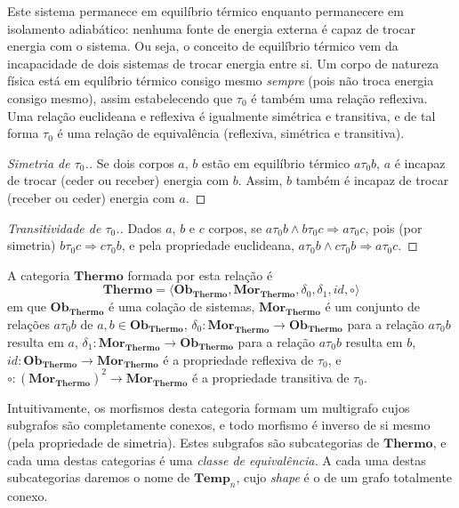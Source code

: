 \documentclass[a4paper]{article}
\newcommand{\trls}{{\tau_0}}
\newcommand{\trl}[2]{{#1 \trls #2}}
\newcommand{\termo}{{\mathbf{Thermo}}}
\newcommand{\obtermo}{{\mathbf{Ob}_\termo}}
\newcommand{\mortermo}{{\mathbf{Mor}_\termo}}
\newcommand{\tempn}[1]{{\mathbf{Temp}_{#1}}}
\newcommand{\temp}{{\tempn{n}}}
\begin{document}
Este sistema permanece em equilíbrio térmico enquanto permanecere em isolamento adiabático: nenhuma fonte de energia externa é capaz de trocar energia com o sistema. Ou seja, o conceito de equilíbrio térmico vem da incapacidade de dois sistemas de trocar energia entre si. Um corpo de natureza física está em equlíbrio térmico consigo mesmo {\it sempre} (pois não troca energia consigo mesmo), assim estabelecendo que $\trls$ é também uma relação reflexiva. Uma relação euclideana e reflexiva é igualmente simétrica e transitiva, e de tal forma $\trls$ é uma relação de equivalência (reflexiva, simétrica e transitiva).

\begin{proof}[Simetria de $\trls$.] \label{pr:simetria}
Se dois corpos $a$, $b$ estão em equilíbrio térmico $\trl{a}{b}$, $a$ é incapaz de trocar (ceder ou receber) energia com $b$. Assim, $b$ também é incapaz de trocar (receber ou ceder) energia com $a$. 
\end{proof}

\begin{proof}[Transitividade de $\trls$.] \label{pr:transitividade}
Dados $a$, $b$ e $c$ corpos, se $\trl{a}{b} \wedge \trl{b}{c} \Rightarrow \trl{a}{c}$, pois (por simetria) $\trl{b}{c} \Rightarrow \trl{c}{b}$, e pela propriedade euclideana, $\trl{a}{b} \wedge \trl{c}{b} \Rightarrow \trl{a}{c}$.
\end{proof}

A categoria $\termo$ formada por esta relação é
\begin{equation} \label{ma:termo}
\termo = \langle \obtermo, \mortermo, \delta_0, \delta_1, id, \circ \rangle
\end{equation}
em que $\obtermo$ é uma colação de sistemas, $\mortermo$ é um conjunto de relações $\trl{a}{b}$ de $a,b \in \obtermo$, $\delta_0: \mortermo \to \obtermo$ para a relação $\trl{a}{b}$ resulta em $a$, $\delta_1: \mortermo \to \obtermo$ para a relação $\trl{a}{b}$ resulta em $b$, $id: \obtermo \to \mortermo$ é a propriedade reflexiva de $\trls$, e $\circ: (\mortermo)^2 \to \mortermo$ é a propriedade transitiva de $\trls$.

Intuitivamente, os morfismos desta categoria formam um multigrafo cujos subgrafos são completamente conexos, e todo morfismo é inverso de si mesmo (pela propriedade de simetria). Estes subgrafos são subcategorias de $\termo$, e cada uma destas categorias é uma {\it classe de equivalência.} A cada uma destas subcategorias daremos o nome de $\temp$, cujo {\it shape} é o de um grafo totalmente conexo.
\end{document}

